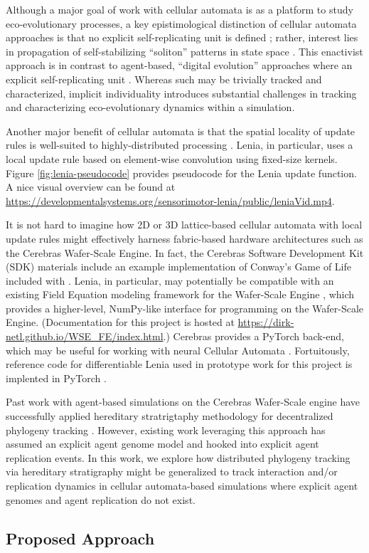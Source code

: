 Although a major goal of work with cellular automata is as a platform to study eco-evolutionary processes, a key epistimological distinction of cellular automata approaches is that no explicit self-replicating unit is defined \citep{hamon2022learning}; rather, interest lies in propagation of self-stabilizing ``soliton'' patterns in state space \citep{chan2019lenia}.
This enactivist approach is in contrast to agent-based, ``digital evolution'' approaches where an explicit self-replicating unit \citep{pennock2007models}.
Whereas such may be trivially tracked and characterized, implicit individuality introduces substantial challenges in tracking and characterizing eco-evolutionary dynamics within a simulation.

Another major benefit of cellular automata is that the spatial locality of update rules is well-suited to highly-distributed processing \citep{ackley2023robust}.
Lenia, in particular, uses a local update rule based on element-wise convolution using fixed-size kernels.
Figure \ref{fig:lenia-pseudocode} provides pseudocode for the Lenia update function.
A nice visual overview can be found at \url{https://developmentalsystems.org/sensorimotor-lenia/public/leniaVid.mp4}.



It is not hard to imagine how 2D or 3D lattice-based cellular automata with local update rules might effectively harness fabric-based hardware architectures such as the Cerebras Wafer-Scale Engine.
In fact, the Cerebras Software Development Kit (SDK) materials include an example implementation of Conway's Game of Life included with \citep{cerebras2024gol}.
Lenia, in particular, may potentially be compatible with an existing Field Equation modeling framework for the Wafer-Scale Engine \citep{woo2022disruptive}, which provides a higher-level, NumPy-like interface for programming on the Wafer-Scale Engine.
(Documentation for this project is hosted at \url{https://dirk-netl.github.io/WSE_FE/index.html}.)
Cerebras provides a PyTorch back-end, which may be useful for working with neural Cellular Automata \citep{cerebras2022pytorch}.
Fortuitously, reference code for differentiable Lenia used in prototype work for this project is implented in PyTorch \citep{hamon2022learning}.

Past work with agent-based simulations on the Cerebras Wafer-Scale engine have successfully applied hereditary stratrigtaphy methodology for decentralized phylogeny tracking \citep{moreno2024trackable}.
However, existing work leveraging this approach has assumed an explicit agent genome model and hooked into explicit agent replication events.
In this work, we explore how distributed phylogeny tracking via hereditary stratigraphy might be generalized to track interaction and/or replication dynamics in cellular automata-based simulations where explicit agent genomes and agent replication do not exist.

\subsection{Proposed Approach}


